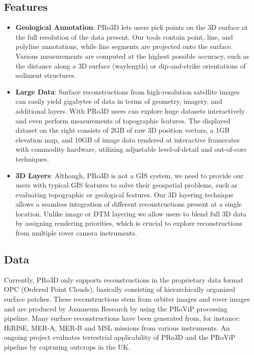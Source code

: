 \subsection{Features}
\label{sec:features}

\begin{itemize}
	\item \textbf{Geological Annotation}: PRo3D lets users pick points on the 3D surface at the full resolution of the data present. Our tools contain point, line, and polyline annotations, while line segments are projected onto the surface. Various measurements are computed at the highest possible accuracy, such as the distance along a 3D surface (waylength) or dip-and-strike orientations of sediment structures. 
	\item \textbf{Large Data}: Surface reconstructions from high-resolution satellite images can easily yield gigabytes of data in terms of geometry, imagery, and additional layers. With PRo3D users can explore huge datasets interactively and even perform measurements of topographic features. The displayed dataset on the right consists of 2GB of raw 3D position vectors, a 1GB elevation map, and 10GB of image data rendered at interactive framerates with commodity hardware, utilizing adjustable level-of-detail and out-of-core techniques. 
	\item \textbf{3D Layers}: Although, PRo3D is not a GIS system, we need to provide our users with typical GIS features to solve their geospatial problems, such as evaluating topographic or geological features. Our 3D layering technique allows a seamless integration of different reconstructions present at a single location. Unlike image or DTM layering we allow users to blend full 3D data by assigning rendering priorities, which is crucial to explore reconstructions from multiple rover camera instruments. 
\end{itemize}
\subsection{Data}
\label{sec:data}

Currently, PRo3D only supports reconstructions in the proprietary data format OPC (Ordered Point Clouds), basically consisting of hierarchically organized surface patches. These reconstructions stem from orbiter images and rover images and are produced by Joanneum Research by using the PRoViP processing pipeline. Many surface reconstructions have been generated from, for instance: HiRISE, MER-A, MER-B and MSL missions from various instruments. An ongoing project evaluates terrestrial applicability of PRo3D and the PRoViP pipeline by capturing outcrops in the UK. 

